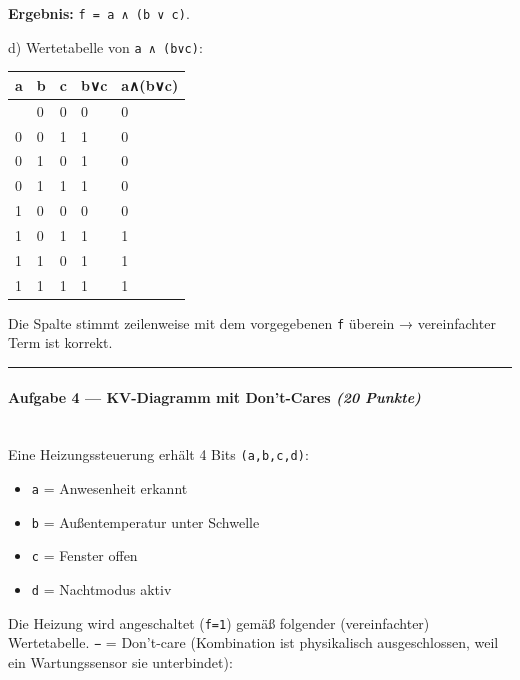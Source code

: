 \documentclass[11pt, a4paper]{article}
\begin{document}
\textbf{Ergebnis:} \texttt{f = a ∧ (b ∨ c)}.


d) Wertetabelle von \texttt{a ∧ (b∨c)}:



{\small
\begin{tabularx}{\linewidth}{XXXXX}
\hline
\rowcolor{tableheadbg}
{\color{white}\textbf{a}} & {\color{white}\textbf{b}} & {\color{white}\textbf{c}} & {\color{white}\textbf{b∨c}} & {\color{white}\textbf{a∧(b∨c)}} \\[2pt]
\hline
\endhead
\hline
\endfoot
0 & 0 & 0 & 0 & 0 \\
0 & 0 & 1 & 1 & 0 \\
0 & 1 & 0 & 1 & 0 \\
0 & 1 & 1 & 1 & 0 \\
1 & 0 & 0 & 0 & 0 \\
1 & 0 & 1 & 1 & 1 \\
1 & 1 & 0 & 1 & 1 \\
1 & 1 & 1 & 1 & 1 \\
\end{tabularx}
}


Die Spalte stimmt zeilenweise mit dem vorgegebenen \texttt{f} überein → vereinfachter Term ist korrekt.



\noindent\textcolor{rulegray}{\rule{\linewidth}{0.4pt}}


\paragraph{Aufgabe 4 — KV-Diagramm mit Don't-Cares \textit{(20 Punkte)}}\mbox{}\\[2pt]

Eine Heizungssteuerung erhält 4 Bits \texttt{(a,b,c,d)}:

\begin{itemize}
  \item \texttt{a} = Anwesenheit erkannt
  \item \texttt{b} = Außentemperatur unter Schwelle
  \item \texttt{c} = Fenster offen
  \item \texttt{d} = Nachtmodus aktiv
\end{itemize}

Die Heizung wird angeschaltet (\texttt{f=1}) gemäß folgender (vereinfachter) Wertetabelle. \texttt{−} = Don't-care (Kombination ist physikalisch ausgeschlossen, weil ein Wartungssensor sie unterbindet):
\end{document}
